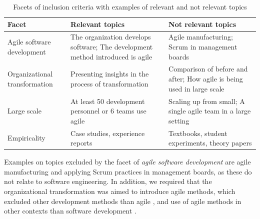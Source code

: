 \begin{table}
    \centering
    \begin{tabular}{ >{\raggedright\arraybackslash}p{}
                     >{\raggedright\arraybackslash}p{}
                     >{\raggedright\arraybackslash}p{} }
        \toprule
        Facet  &  Relevant topics  &  Not relevant topics  \\
        \midrule
        Agile software development  & 
                The organization develops software;
                The development method introduced is agile  & 
                
                Agile manufacturing;
                Scrum in management boards  \\
                
        Organizational transformation  &
                Presenting insights in the process of transformation  &
                
                Comparison of before and after;
                How agile is being used in large scale   \\
                
        Large scale    &
                At least 50 development personnel or 6 teams use agile &
                
                Scaling up from small;
                A single agile team in a large setting \\
                
        Empiricality   &
                Case studies, experience reports  &
                
                Textbooks, student experiments, theory papers  \\
        \bottomrule
    \end{tabular}
    \caption{Facets of inclusion criteria with examples of relevant and
             not relevant topics}
    \label{table:facets}
\end{table}

Examples on topics excluded by the facet of \emph{agile software development}
are agile manufacturing and applying Scrum practices in management boards, as
these do not relate to software engineering. In addition, we required that the
organizational transformation was aimed to introduce agile methods, which
excluded other development methods than agile \citep{Sagesser2013}, and use of
agile methods in other contexts than software development \citep{Hodgkins2007}.

